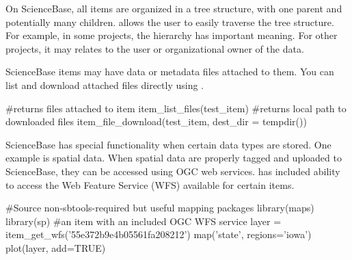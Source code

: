On ScienceBase, all items are organized in a tree structure, with one 
parent and potentially many children.  allows the user to 
easily traverse the tree structure. For example, in some projects, the hierarchy has 
important meaning. For other projects, it may relates to the user or
organizational owner of the data.


ScienceBase items may have data or metadata files attached to them. 
You can list and download attached files directly using .

\begin{example}
#returns files attached to item
item_list_files(test_item)
#returns local path to downloaded files
item_file_download(test_item, dest_dir = tempdir())
\end{example}

ScienceBase has special functionality when certain data types are 
stored. One example is spatial data. When spatial data are properly 
tagged and uploaded to ScienceBase, they can be accessed using OGC 
web services.  has included ability to access the Web
Feature Service (WFS) available for certain items.

\begin{example}
#Source non-sbtools-required but useful mapping packages
library(maps)
library(sp)
#an item with an included OGC WFS service
layer = item_get_wfs('55e372b9e4b05561fa208212')
map('state', regions='iowa')
plot(layer, add=TRUE)
\end{example}

